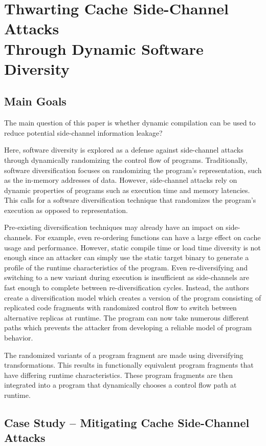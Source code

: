 
\section{Thwarting Cache Side-Channel Attacks \\ Through Dynamic Software Diversity}

\subsection{Main Goals}
The main question of this paper is whether dynamic compilation can be used to reduce potential side-channel information leakage?

Here, software diversity is explored as a defense against side-channel attacks
through dynamically randomizing the control flow of programs. Traditionally,
software diversification focuses on randomizing the program's representation,
such as the in-memory addresses of data. However, side-channel attacks rely on
dynamic properties of programs such as execution time and memory latencies.
This calls for a software diversification technique that randomizes the
program's execution as opposed to representation. 

Pre-existing diversification techniques may already have an impact on side-channels. For example, even re-ordering functions can have a large effect on
cache usage and performance. However, static compile time or load time
diversity is not enough since an attacker can simply use the static target
binary to generate a profile of the runtime characteristics of the program.
Even re-diversifying and switching to a new variant during execution is
insufficient as side-channels are fast enough to complete between
re-diversification cycles. Instead, the authors create a diversification model
which creates a version of the program consisting of replicated code fragments
with randomized control flow to switch between alternative replicas at runtime.
The program can now take numerous different paths which prevents the attacker
from developing a reliable model of program behavior. 

The randomized variants of a program fragment are made using diversifying 
transformations. This results in functionally equivalent program fragments that
have differing runtime characteristics. These program fragments are then
integrated into a program that dynamically chooses a control flow path at
runtime. 

\subsection{Case Study -- Mitigating Cache Side-Channel Attacks}


